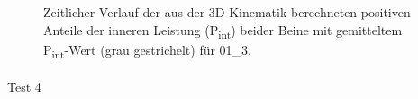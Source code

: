 \documentclass[
  letterpaper,
  DIV=11]{scrartcl}
\makeatletter
\let\oldparagraph\paragraph
\renewcommand{\paragraph}{
    \@ifstar
      \xxxParagraphStar
      \xxxParagraphNoStar
  }
\newcommand{\xxxParagraphStar}[1]{\oldparagraph*{#1}\mbox{}}
\newcommand{\xxxParagraphNoStar}[1]{\oldparagraph{#1}\mbox{}}
\makeatother
\begin{document}
\begin{figure}


\caption{\label{fig-PInt_Kinematik_01_3}Zeitlicher Verlauf der aus der
3D-Kinematik berechneten positiven Anteile der inneren Leistung
(P\textsubscript{int}) beider Beine mit gemitteltem
P\textsubscript{int}-Wert (grau gestrichelt) für 01\_3.}

\end{figure}%

\paragraph{Test 4}
\end{document}

